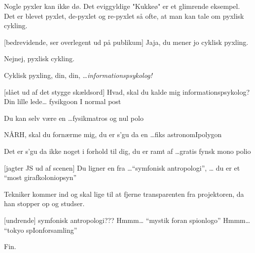 \documentclass[danish]{article}
\begin{document}
\begin{sketch}
Nogle pyxler kan ikke dø. Det eviggyldige "Kukkeø" er et glimrende
eksempel. Det er blevet pyxlet, de-pyxlet og re-pyxlet så ofte, at man
kan tale om pyxlisk cykling.

[bedrevidende, ser overlegent ud på publikum] Jaja, du mener
jo cyklisk pyxling.

 Nejnej, pyxlisk cykling.

 Cyklisk pyxling,  din, din,
\ldots \emph{informationspsykolog!}

[slået ud af det stygge skældsord] Hvad, skal du kalde mig
informationspsykolog? Din lille lede\ldots
fysikgoon I normal post

 Du kan selv være en \ldots fysikmatros og nul polo

 NÅRH, skal du fornærme mig, du er s'gu da en \ldots fiks
astronomIpolygon

 Det er s'gu da ikke noget i forhold til dig, du er 
ramt af
 \ldots gratis fynsk mono polio

[jagter JS ud af scenen]  Du ligner en fra \ldots ``symfonisk
antropologi'', \ldots{} du er et  ``most girafkoloniopsyn''

\scene Tekniker kommer ind og skal lige til at fjerne transparenten
fra projektoren, da han stopper op og studser.

[undrende] symfonisk antropologi??? Hmmm\ldots
{} ``mystik foran spionlogo''
Hmmm\ldots{} 
 ``tokyo spIonforsamling''

\scene Fin.

\end{sketch}
\end{document}
